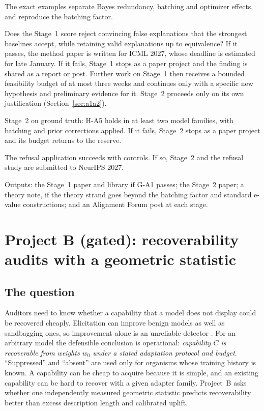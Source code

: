 \documentclass[11pt,a4paper]{article}
\begin{document}
\begin{description}[style=nextline,leftmargin=1.5em]
\item[G-A0, end of week 2.] The exact examples separate Bayes redundancy,
batching and optimizer effects, and reproduce the batching factor.
\item[G-A1, end of week 6 (mid-November 2026): the decision gate.] Does the
Stage~1 score reject convincing false explanations that the strongest
baselines accept, while retaining valid explanations up to equivalence?
If it passes, the method paper is written for ICML 2027, whose deadline is
estimated for late January. If it fails, Stage~1 stops as a paper project and the finding is shared as a report or post. Further work on Stage~1 then receives a bounded feasibility budget of at most three weeks and continues only with a specific new hypothesis and preliminary evidence for it. Stage~2 proceeds only on its own justification (Section~\ref{sec:a1a2}).
\item[G-A2, month 5 (February--March 2027).] Stage~2 on ground truth: H-A5 holds in at least two model families, with batching and prior corrections applied. If it fails, Stage~2 stops as a paper project and its budget returns to the reserve.
\item[G-A3, month 7 (May 2027).] The refusal application succeeds with
controls. If so, Stage~2 and the refusal study are submitted to NeurIPS
2027.
\end{description}
\noindent Outputs: the Stage~1 paper and library if G-A1 passes; the
Stage~2 paper; a theory note, if the theory strand goes beyond the batching factor and standard e-value constructions; and an Alignment Forum post at
each stage.

\section{Project B (gated): recoverability audits with a geometric statistic}
\label{sec:projB}

\subsection{The question}

Auditors need to know whether a capability that a model does not display
could be recovered cheaply. Elicitation can improve benign models as well
as sandbagging ones, so improvement alone is an unreliable detector
\cite{taylor2025}. For an arbitrary model the defensible conclusion is
operational: \emph{capability $C$ is recoverable from weights $w_0$ under
a stated adaptation protocol and budget}. ``Suppressed'' and ``absent''
are used only for organisms whose training history is known. A capability
can be cheap to acquire because it is simple, and an existing capability
can be hard to recover with a given adapter family. Project~B asks whether
one independently measured geometric statistic predicts recoverability
better than excess description length and calibrated uplift.
\end{document}
